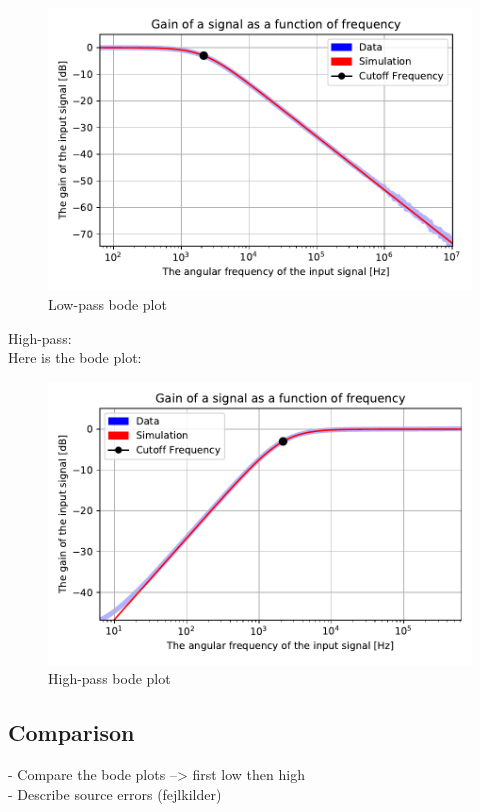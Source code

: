 \begin{figure}[H]
\center
	\includegraphics[scale=0.5]{fig/img/bode_LPF_exp.pdf}
	\caption{Low-pass bode plot}
	\label{lp:bode}
\end{figure}
High-pass: \\
Here is the bode plot:

\begin{figure}[H]
\center
	\includegraphics[scale=0.5]{fig/img/bode_HPF_exp.pdf}
	\caption{High-pass bode plot}
	\label{hp:bode}
\end{figure}


\subsection{Comparison}
- Compare the bode plots --> first low then high \\
- Describe source errors (fejlkilder)

